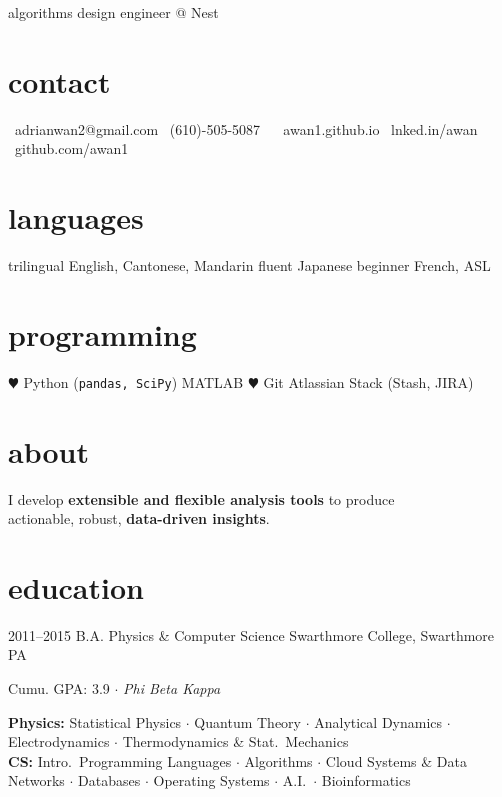 \documentclass[]{friggeri-cv}
\begin{document}
       {algorithms design engineer @ Nest}


\begin{aside}
  \section{contact}
    \href{mailto:adrianwan2@gmail.com?subject=Regarding%20your%20resume}{\faEnvelope}~adrianwan2@gmail.com
    \faPhone~(610)-505-5087
    ~
    \href{http://awan1.github.io}{\faGlobe}~awan1.github.io
    \href{http://linkedin.com/in/adrianwan2}{\faLinkedin}~lnked.in/awan
    \href{http://github.com/awan1}{\faGithub}~github.com/awan1
  \section{languages}
    trilingual English, Cantonese, Mandarin
    fluent Japanese
    beginner French, ASL
  \section{programming}
    {\color{red} $\varheart$} Python
    (\texttt{pandas, SciPy})
    MATLAB
    {\color{red} $\varheart$} Git
    Atlassian Stack
    (Stash, JIRA)

\end{aside}

\section{about}
I develop \textbf{extensible and flexible analysis tools} to produce \\
actionable, robust, \textbf{data-driven insights}.

\section{education}

\begin{entrylist}
  \entry
    {2011--2015}
    {B.A. {\normalfont Physics \& Computer Science}}
    {Swarthmore College, Swarthmore PA}
    {Cumu. GPA: 3.9 $\cdot$ \emph{Phi Beta Kappa} %
     \smallskip

     \textbf{Physics:}
     Statistical Physics $\cdot$
     Quantum Theory $\cdot$
     Analytical Dynamics $\cdot$
     \\
     Electrodynamics $\cdot$
     Thermodynamics \& Stat.\ Mechanics %
     \\
     \textbf{CS:}
     Intro.\ Programming Languages $\cdot$
     Algorithms $\cdot$
     Cloud Systems \& Data \\ Networks $\cdot$
     Databases $\cdot$
     Operating Systems $\cdot$
     A.I.\ $\cdot$
     Bioinformatics %
     }
\end{entrylist}
\end{document}

